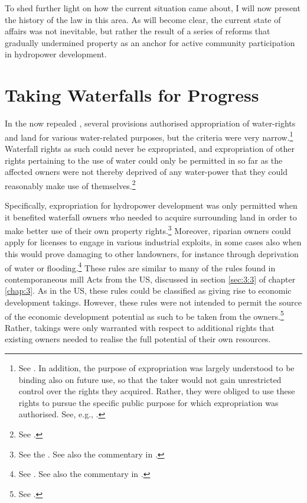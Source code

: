 To shed further light on how the current situation came about, I will now present the history of the law in this area. As will become clear, the current state of affairs was not inevitable, but rather the result of a series of reforms that gradually undermined property as an anchor for active community participation in hydropower development.

\section{Taking Waterfalls for Progress}\label{sec:5:4}

In the now repealed \cite{wra88}, several provisions authorised appropriation of water-rights and land for various water-related purposes, but the criteria were very narrow.\footnote{See \cite[69-85]{dahl88}. In addition, the purpose of expropriation was largely understood to be binding also on future use, so that the taker would not gain unrestricted control over the rights they acquired. Rather, they were obliged to use these rights to pursue the specific public purpose for which expropriation was authorised. See, e.g., \cite[133-140]{rygh12}.} Waterfall rights as such could never be expropriated, and expropriation of other rights pertaining to the use of water could only be permitted in so far as the affected owners were not thereby deprived of any water-power that they could reasonably make use of themselves.\footnote{See \cite[58|60]{dahl88}.}

Specifically, expropriation for hydropower development was only permitted when it benefited waterfall owners who needed to acquire surrounding land in order to make better use of their own property rights.\footnote{See the \dni\cite[15, 16]{wra88}. See also the commentary in \cite[60-65]{dahl88}.} Moreover, riparian owners could apply for licenses to engage in various industrial exploits, in some cases also when this would prove damaging to other landowners, for instance through deprivation of water or flooding.\footnote{See \dni\cite[14]{wra88}. See also the commentary in \cite[54-60]{dahl88}.} These rules are similar to many of the rules found in contemporaneous mill Acts from the US, discussed in section \ref{sec:3:3} of chapter \ref{chap:3}. As in the US, these rules could be classified as giving rise to economic development takings. However, these rules were not intended to permit the source of the economic development potential as such to be taken from the owners.\footnote{See \cite[168-170]{dahl88}.} Rather, takings were only warranted with respect to additional rights that existing owners needed to realise the full potential of their own resources.

